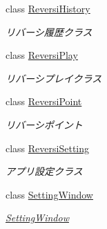 \begin{DoxyCompactItemize}
class \hyperlink{class_reversi_wpf_1_1_reversi_history}{Reversi\+History}
\begin{DoxyCompactList}\small\item\em リバーシ履歴クラス \end{DoxyCompactList}\item 
class \hyperlink{class_reversi_wpf_1_1_reversi_play}{Reversi\+Play}
\begin{DoxyCompactList}\small\item\em リバーシプレイクラス \end{DoxyCompactList}\item 
class \hyperlink{class_reversi_wpf_1_1_reversi_point}{Reversi\+Point}
\begin{DoxyCompactList}\small\item\em リバーシポイント \end{DoxyCompactList}\item 
class \hyperlink{class_reversi_wpf_1_1_reversi_setting}{Reversi\+Setting}
\begin{DoxyCompactList}\small\item\em アプリ設定クラス \end{DoxyCompactList}\item 
class \hyperlink{class_reversi_wpf_1_1_setting_window}{Setting\+Window}
\begin{DoxyCompactList}\small\item\em \hyperlink{class_reversi_wpf_1_1_setting_window}{Setting\+Window} \end{DoxyCompactList}\end{DoxyCompactItemize}
